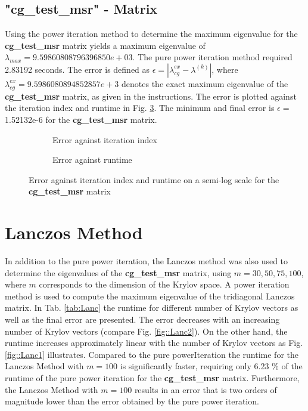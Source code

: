 \documentclass[11pt,a4paper]{article}
\newcommand{\refFig}[1]{Fig. \ref{#1}}
\newcommand{\refTab}[1]{Tab. \ref{#1}}
\begin{document}
\subsection{"{cg\_test\_msr}" - Matrix}
Using the power iteration method to determine the maximum eigenvalue for the \textbf{cg\_test\_msr} matrix yields a maximum eigenvalue of $\lambda_{max} = 9.59860808796396850e+03$. The pure power iteration method required 2.83192 seconds. The error is defined as $\epsilon = |\lambda_{cg}^{ex} - \lambda^{(k)}|$, where $\lambda_{cg}^{ex} = 9.5986080894852857e+3$ denotes the exact maximum eigenvalue of the \textbf{cg\_test\_msr} matrix, as given in the instructions. The error is plotted against the iteration index and runtime in \refFig{fig::PowerIt}. The minimum and final error is $\epsilon =$ 1.52132e-6 for the \textbf{cg\_test\_msr} matrix.

\begin{figure}[h!]
	\centering
	\begin{subfigure}[h!]{.49\textwidth}
		\begin{center}
			\resizebox{0.52\width}{!}{}
			\caption{Error against iteration index}
			\label{fig::Power1}
		\end{center}	
	\end{subfigure}
	\hfill
	\begin{subfigure}[h!]{.49\textwidth}
		\centering
		\resizebox{0.52\width}{!}{}
		\caption{Error against runtime}
		\label{fig::Power2}
	\end{subfigure}
	\caption{Error against iteration index and runtime on a semi-log scale for the \textbf{cg\_test\_msr} matrix}
	\label{fig::PowerIt}
\end{figure}
	
\section{Lanczos Method}
In addition to the pure power iteration, the Lanczos method was also used to determine the eigenvalues of the \textbf{cg\_test\_msr} matrix, using $m = 30,50,75,100$, where $m$ corresponds to the dimension of the Krylov space. A power iteration method is used to compute the  maximum eigenvalue of the tridiagonal Lanczos matrix. In \refTab{tab:Lanc} the runtime for different number of Krylov vectors as well as the final error are presented. The error decreases with an increasing number of Krylov vectors (compare \refFig{fig::Lanc2}). On the other hand, the runtime increases approximately linear with the number of Krylov vectors as \refFig{fig::Lanc1} illustrates. 
Compared to the pure powerIteration the runtime for the Lanczos Method with $m=100$ is significantly faster, requiring only 6.23 \% of the runtime of the pure power iteration for the \textbf{cg\_test\_msr} matrix. Furthermore, the Lanczos Method with $m=100$ results in an error that is two orders of magnitude lower than the error obtained by the pure power iteration.
\end{document}
